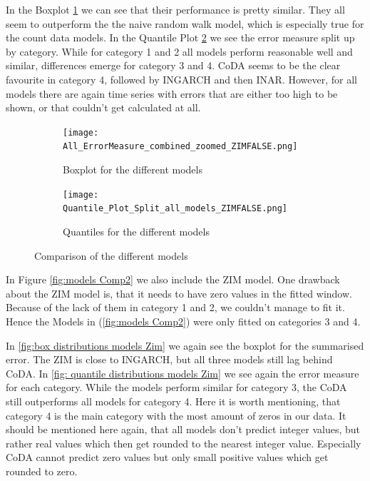 In the Boxplot \ref{fig:box distributions models} we can see that their performance is pretty similar. They all seem to outperform the the naive random walk model, which is especially true for the count data models. 
In the Quantile Plot \ref{fig: quantile distributions models} we see the error measure split up by category. While for category 1 and 2 all models perform reasonable well and similar, differences emerge for category 3 and 4. CoDA seems to be the clear favourite in category 4, followed by INGARCH and then INAR. However, for all models there are again time series with errors that are either too high to be shown, or that couldn't get calculated at all. 
\begin{figure}[htb!]
\centering
\begin{subfigure}[b]{0.8\textwidth}
\texttt{[image: All\_ErrorMeasure\_combined\_zoomed\_ZIMFALSE.png]}
\caption{Boxplot for the different models}
\label{fig:box distributions models}
\end{subfigure}
\hfill
\begin{subfigure}[b]{0.8\textwidth}
\texttt{[image: Quantile\_Plot\_Split\_all\_models\_ZIMFALSE.png]}
\caption{Quantiles for the different models}
\label{fig: quantile distributions models}
\end{subfigure}
\hfill
\caption{Comparison of the different models}
\label{fig:models Comp1}
\end{figure}

In Figure \ref{fig:models Comp2} we also include the ZIM model. One drawback about the ZIM model is, that it needs to have zero values in the fitted window. Because of the lack of them in category 1 and 2, we couldn't manage to fit it. Hence the Models in (\ref{fig:models Comp2}) were only fitted on categories 3 and 4. 

In \ref{fig:box distributions models Zim} we again see the boxplot for the summarised error. The ZIM is close to INGARCH, but all three models still lag behind CoDA. In \ref{fig: quantile distributions models Zim} we see again the error measure for each category. While the models perform similar for category 3, the CoDA still outperforms all models for category 4. Here it is worth mentioning, that category 4 is the main category with the most amount of zeros in our data. It should be mentioned here again, that all models don't predict integer values, but rather real values which then get rounded to the nearest integer value. Especially CoDA cannot predict zero values but only small positive values which get rounded to zero.

